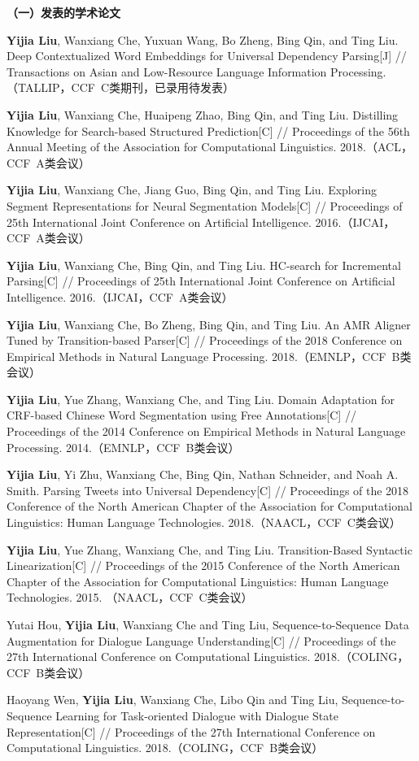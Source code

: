 
\begin{publication}
\noindent\textbf{（一）发表的学术论文}
\begin{publist}
\item \textbf{Yijia Liu}, Wanxiang Che, Yuxuan Wang, Bo Zheng, Bing Qin, and Ting Liu. Deep Contextualized Word Embeddings for Universal Dependency Parsing[J] // Transactions on Asian and Low-Resource Language Information Processing.（TALLIP，CCF~C类期刊，已录用待发表）
\item \textbf{Yijia Liu}, Wanxiang Che, Huaipeng Zhao, Bing Qin, and Ting Liu. Distilling Knowledge for Search-based Structured Prediction[C] // Proceedings of the 56th Annual Meeting of the Association for Computational Linguistics. 2018.（ACL，CCF~A类会议）
\item \textbf{Yijia Liu}, Wanxiang Che, Jiang Guo, Bing Qin, and Ting Liu. Exploring Segment Representations for Neural Segmentation Models[C] // Proceedings of 25th International Joint Conference on Artificial Intelligence. 2016.（IJCAI，CCF~A类会议）
\item \textbf{Yijia Liu}, Wanxiang Che, Bing Qin, and Ting Liu. HC-search for Incremental Parsing[C] // Proceedings of 25th International Joint Conference on Artificial Intelligence. 2016.（IJCAI，CCF~A类会议）
\item \textbf{Yijia Liu}, Wanxiang Che, Bo Zheng, Bing Qin, and Ting Liu.  An AMR Aligner Tuned by Transition-based Parser[C] // Proceedings of the 2018 Conference on Empirical Methods in Natural Language Processing. 2018.（EMNLP，CCF~B类会议）
\item \textbf{Yijia Liu}, Yue Zhang, Wanxiang Che, and Ting Liu. Domain Adaptation for CRF-based Chinese Word Segmentation using Free Annotations[C] // Proceedings of the 2014 Conference on Empirical Methods in Natural Language Processing. 2014.（EMNLP，CCF~B类会议）
\item \textbf{Yijia Liu}, Yi Zhu, Wanxiang Che, Bing Qin, Nathan Schneider, and Noah A. Smith. Parsing Tweets into Universal Dependency[C] // Proceedings of the 2018 Conference of the North American Chapter of the Association for Computational Linguistics: Human Language Technologies. 2018.（NAACL，CCF~C类会议）
\item \textbf{Yijia Liu}, Yue Zhang, Wanxiang Che, and Ting Liu. Transition-Based Syntactic Linearization[C] // Proceedings of the 2015 Conference of the North American Chapter of the Association for Computational Linguistics: Human Language Technologies. 2015. （NAACL，CCF~C类会议）
\item Yutai Hou, \textbf{Yijia Liu}, Wanxiang Che and Ting Liu, Sequence-to-Sequence Data Augmentation for Dialogue Language Understanding[C] // Proceedings of the 27th International Conference on Computational Linguistics. 2018.（COLING，CCF~B类会议）
\item Haoyang Wen, \textbf{Yijia Liu}, Wanxiang Che, Libo Qin and Ting Liu, Sequence-to-Sequence Learning for Task-oriented Dialogue with Dialogue State Representation[C] // Proceedings of the 27th International Conference on Computational Linguistics. 2018.（COLING，CCF~B类会议）
\end{publist}


\end{publication}
